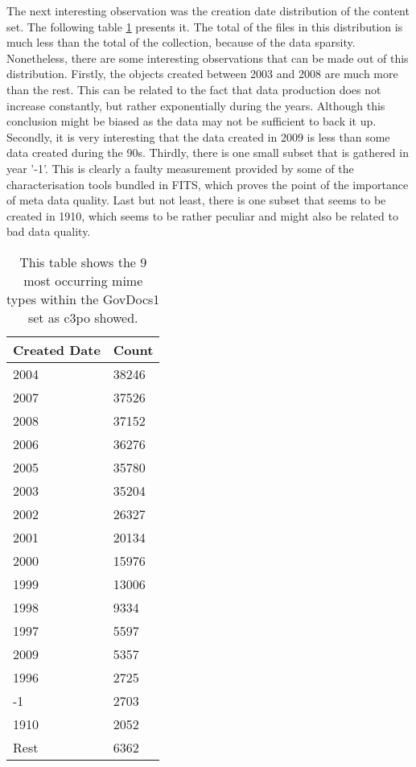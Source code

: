 The next interesting observation was the creation date distribution of the content set.
The following table \ref{tab:govdocs1_created} presents it.
The total of the files in this distribution is much less than the total of the collection, because of the data sparsity.
Nonetheless, there are some interesting observations that can be made out of this distribution.
Firstly, the objects created between 2003 and 2008 are much more than the rest.
This can be related to the fact that data production does not increase constantly, but rather exponentially during the years.
Although this conclusion might be biased as the data may not be sufficient to back it up.
Secondly, it is very interesting that the data created in 2009 is  less than some data created during the 90s.
Thirdly, there is one small subset that is gathered in year '-1'.
This is clearly a faulty measurement provided by some of the characterisation tools bundled in FITS, which proves the point of the importance of meta data quality.
Last but not least, there is one subset that seems to be created in 1910, which seems to be rather peculiar and might also be related to bad data quality.

\begin{table}[h]
\centering
\begin{tabular}{l || l }
\hline
Created Date & Count \\
\hline
\hline
2004 	& 38246 \\
2007 	&  37526 \\
2008		&  37152 \\
2006 	&  36276 \\
2005		&  35780 \\
2003		&  35204 \\
2002		&  26327 \\
2001		&  20134 \\
2000		& 15976 \\
1999		& 13006 \\
1998		&  9334 \\
1997		&  5597 \\
2009		&  5357\\
1996		&  2725\\
-1		&  2703\\
1910		&  2052\\
Rest		&  6362\\
 \hline
\end{tabular}
\caption{This table shows the 9 most occurring mime types within the GovDocs1 set as c3po showed.}
\label{tab:govdocs1_created}
\end{table}

